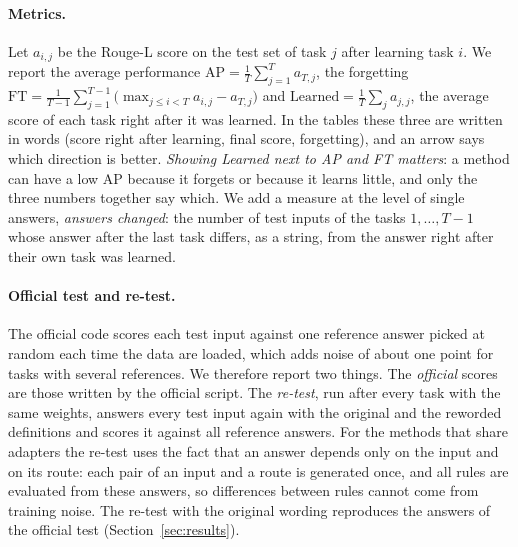 \paragraph{Metrics.} Let $a_{i,j}$ be the Rouge-L score \citep{lin2004rouge} on the test set of task
$j$ after learning task $i$. We report the average performance
$\mathrm{AP} = \tfrac{1}{T}\sum_{j=1}^{T} a_{T,j}$, the forgetting
$\mathrm{FT} = \tfrac{1}{T-1}\sum_{j=1}^{T-1}\bigl(\max_{j \le i < T} a_{i,j} - a_{T,j}\bigr)$ and
$\mathrm{Learned} = \tfrac{1}{T}\sum_{j} a_{j,j}$, the average score of each task right after it was
learned. In the tables these three are written in words (score right after learning, final score, forgetting), and an arrow says which direction is better. \emph{Showing Learned next to AP and FT matters}: a method can have a low AP because it
forgets or because it learns little, and only the three numbers together say which. We add a
measure at the level of single answers, \emph{answers changed}: the number of test inputs of the
tasks $1, \dots, T-1$ whose answer after the last task differs, as a string, from the answer right
after their own task was learned.

\paragraph{Official test and re-test.} The official code scores each test input against one
reference answer picked at random each time the data are loaded, which adds noise of about one
point for tasks with several references. We therefore report two things. The \emph{official} scores
are those written by the official script. The \emph{re-test}, run after every task with the same
weights, answers every test input again with the original and the reworded definitions and scores
it against all reference answers. For the methods that share adapters the re-test uses the fact
that an answer depends only on the input and on its route: each pair of an input and a route is
generated once, and all rules are evaluated from these answers, so differences between rules cannot
come from training noise. The re-test with the original wording reproduces the answers of the
official test (Section~\ref{sec:results}).

